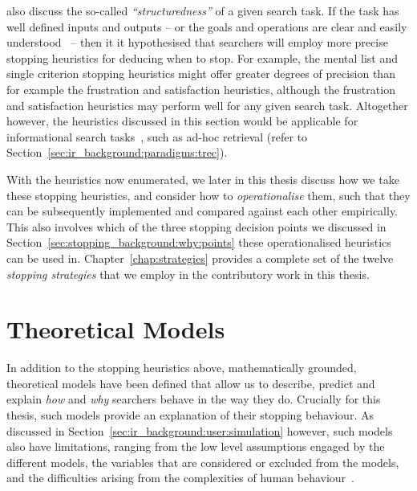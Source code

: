 
\cite{browne2005stopping_rules} also discuss the so-called \emph{``structuredness''} of a given search task. If the task has well defined inputs and outputs -- or the goals and operations are clear and easily understood~\citep{simon1996sciences} -- then it it hypothesised that searchers will employ more precise stopping heuristics for deducing when to stop. For example, the mental list and single criterion stopping heuristics might offer greater degrees of precision than for example the frustration and satisfaction heuristics, although the frustration and satisfaction heuristics may perform well for any given search task. Altogether however, the heuristics discussed in this section would be applicable for informational search tasks~\citep{browne2005stopping_rules}, such as ad-hoc retrieval (refer to Section~\ref{sec:ir_background:paradigms:trec}).

With the heuristics now enumerated, we later in this thesis discuss how we take these stopping heuristics, and consider how to \emph{operationalise} them, such that they can be subsequently implemented and compared against each other empirically. This also involves which of the three stopping decision points we discussed in Section~\ref{sec:stopping_background:why:points} these operationalised heuristics can be used in. Chapter~\ref{chap:strategies} provides a complete set of the twelve \emph{stopping strategies} that we employ in the contributory work in this thesis.

\section{Theoretical Models}\label{sec:stopping_background:theoretical}
In addition to the stopping heuristics above, mathematically grounded, theoretical models have been defined that allow us to describe, predict and explain \emph{how} and \emph{why} searchers behave in the way they do. Crucially for this thesis, such models provide an explanation of their stopping behaviour. As discussed in Section~\ref{sec:ir_background:user:simulation} however, such models also have limitations, ranging from the low level assumptions engaged by the different models, the variables that are considered or excluded from the models, and the difficulties arising from the complexities of human behaviour~\citep{fishwick1995simulation, azzopardi2015theories}.

